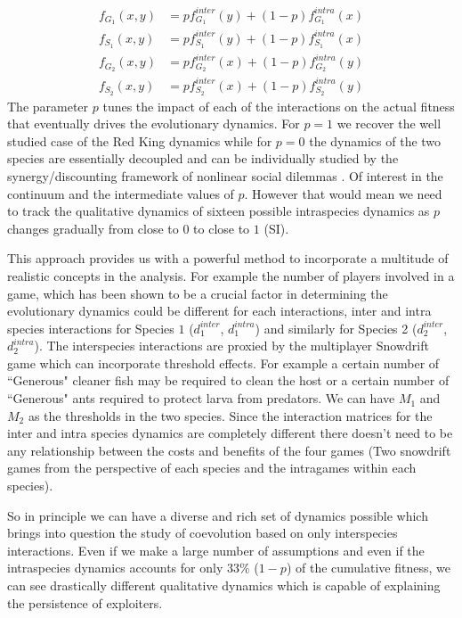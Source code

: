 \documentclass{pnastwo}
\begin{document}
\begin{article}
%
\begin{align}
	f_{G_1} (x,y) &= p f^{inter}_{G_1} (y) + (1-p) f^{intra}_{G_1} (x) \nonumber \\
	f_{S_1} (x,y) &= p f^{inter}_{S_1} (y) + (1-p) f^{intra}_{S_1} (x) \nonumber \\
	f_{G_2} (x,y) &= p f^{inter}_{G_2} (x) + (1-p) f^{intra}_{G_2} (y) \\
	f_{S_2} (x,y) &= p f^{inter}_{S_2} (x) + (1-p) f^{intra}_{S_2} (y) \nonumber
\end{align}
%
The parameter $p$ tunes the impact of each of the interactions on the actual fitness that eventually drives the evolutionary dynamics.
For $p=1$ we recover the well studied case of the Red King dynamics \cite{gokhale:PRSB:2012} while for $p=0$ the dynamics of the two species are essentially decoupled and can be individually studied by the synergy/discounting framework of nonlinear social dilemmas \cite{hauert:JTB:2006a}.
Of interest in the continuum and the intermediate values of $p$.
However that would mean we need to track the qualitative dynamics of sixteen possible intraspecies dynamics as $p$ changes gradually from close to $0$ to close to $1$ (SI). 

This approach provides us with a powerful method to incorporate a multitude of realistic concepts in the analysis.
For example the number of players involved in a game, which has been shown to be a crucial factor in determining the evolutionary dynamics could be different for each interactions, inter and intra species interactions for Species $1$ ($d^{inter}_1$, $d^{intra}_1$) and similarly for Species 2 ($d^{inter}_2$, $d^{intra}_2$). 
The interspecies interactions are proxied by the multiplayer Snowdrift game which can incorporate threshold effects.
For example a certain number of ``Generous" cleaner fish may be required to clean the host or a certain number of ``Generous" ants required to protect larva from predators.
We can have $M_1$ and $M_2$ as the thresholds in the two species.
Since the interaction matrices for the inter and intra species dynamics are completely different there doesn't need to be any relationship between the costs and benefits of the four games (Two snowdrift games from the perspective of each species and the intragames within each species).

So in principle we can have a diverse and rich set of dynamics possible which brings into question the study of coevolution based on only interspecies interactions. Even if we make a large number of assumptions and even if the intraspecies dynamics accounts for only $33\%$ ($1-p$) of the cumulative fitness, we can see drastically different qualitative dynamics which is capable of explaining the persistence of exploiters.


\end{article}
\end{document}
